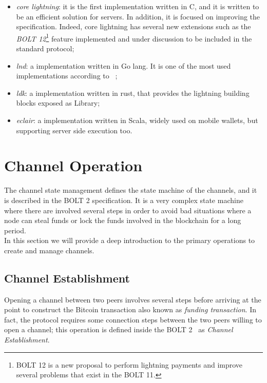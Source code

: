 \begin{itemize}
  \item \emph{core lightning}: it is the first implementation written in C, and it is written
        to be an efficient solution for servers. In addition, it is focused on improving the {\LN} specification. Indeed, core lightning has several new extensions such as the \emph{BOLT 12}\footnote{BOLT 12 is a new proposal to perform
        lightning payments and improve several problems that exist in the BOLT 11.} feature implemented and under discussion to be
        included in the standard protocol;
    \item \emph{lnd}: a {\LN} implementation written in Go lang. It is one of the most used {\LN} implementations according to ~\cite{lngossip};
  \item \emph{ldk}: a {\LN} implementation written in rust, that provides the lightning building blocks exposed as Library;
  \item \emph{eclair}: a {\LN} implementation written in Scala, widely used on mobile wallets, but supporting server side execution too.
\end{itemize}

\section{{\LN} Channel Operation}
\label{sec:channel_state}

The channel state management defines the state machine of the channels, and it is described in the BOLT 2 specification. It is a very complex
state machine where there are involved several steps in order to avoid bad
situations where a node can steal funds or lock the funds involved in the blockchain for a long period.\\
In this section we will provide a deep introduction to the primary operations to create and manage channels.

\subsection{Channel Establishment}
\label{sec:open_a_channels}

Opening a channel between two peers involves several steps before arriving at the point to construct the Bitcoin transaction also
known as \emph{funding transaction}.
In fact, the {\LN} protocol requires some connection steps between the two peers willing to open a channel; this
operation is defined inside the BOLT 2~\cite{bolt2} as \emph{Channel Establishment}.

